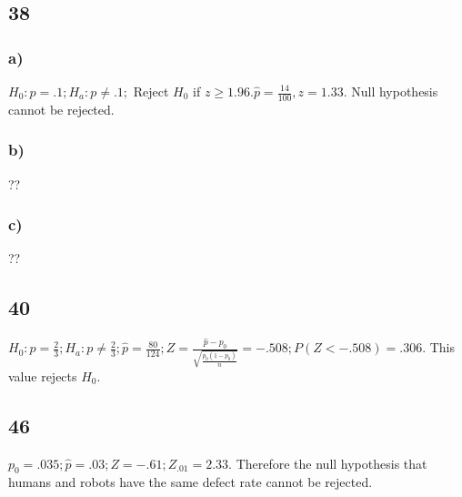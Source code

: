 \documentclass{article}
\begin{document}
	\subsection*{38}
		\subsubsection*{a)}
			$H_0: p=.1; H_a: p\not =.1;$ Reject $H_0$ if $z \geq 1.96. \hat{p} = 
			\frac{14}{100}, z= 1.33.$ Null hypothesis cannot be rejected. 
		\subsubsection*{b)}
			??
		\subsubsection*{c)}
			?? 
	\subsection*{40}
		$H_0: p = \frac{2}{3}; H_a: p \not = \frac{2}{3}; \hat{p} = \frac{80}{124}; Z = \frac{\hat{p} - p_0}{\sqrt{\frac{p_0(1-p_0)}{n}}} = -.508; P(Z < -.508) = .306.$ This value rejects $H_0$. 
	\subsection*{46}
		$p_0 = .035; \hat{p} = .03; Z = -.61; Z_{.01} = 2.33.$ Therefore the null hypothesis that humans and robots have the same defect rate cannot be rejected. 			
				
				 
	 		
\end{document}
